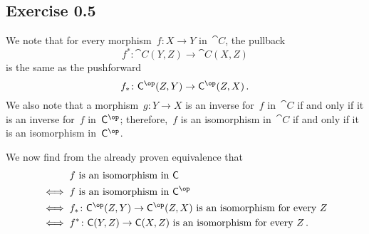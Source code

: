 \subsection{Exercise 0.5}
\label{exercise 0.5}

We note that for every morphism~$f \colon X \to Y$ in~$\cat{C}$, the pullback
\[
	f^* \colon \cat{C}(Y, Z) \to \cat{C}(X, Z)
\]
is the same as the pushforward
\[
	f_* \colon \cat{C}^{\op}(Z, Y) \to \cat{C}^{\op}(Z, X) \,.
\]
We also note that a morphism~$g \colon Y \to X$ is an inverse for~$f$ in~$\cat{C}$ if and only if it is an inverse for~$f$ in~$\cat{C}^{\op}$;
therefore,~$f$ is an isomorphism in~$\cat{C}$ if and only if it is an isomorphism in~$\cat{C}^{\op}$.

We now find from the already proven equivalence that
\begin{align*}
	{}&
	\text{$f$ is an isomorphism in~$\cat{C}$}
	\\
	\iff{}&
	\text{$f$ is an isomorphism in~$\cat{C}^{\op}$}
	\\
	\iff{}&
	\text{$f_* \colon \cat{C}^{\op}(Z, Y) \to \cat{C}^{\op}(Z, X)$ is an isomorphism for every~$Z$}
	\\
	\iff{}&
	\text{$f^* \colon \cat{C}(Y, Z) \to \cat{C}(X, Z)$ is an isomorphism for every~$Z$} \,.
\end{align*}
